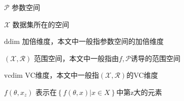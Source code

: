 
\begin{notation}

  \begin{notationlist}{2em}
    \item[$\displaystyle \mathcal{P}$] 参数空间
    \item[$\displaystyle \mathcal{X}$] 数据集所在的空间 
    \item[$\displaystyle \text{ddim}$] 加倍维度，本文中一般指参数空间的加倍维度
    \item[$\displaystyle (\mathcal{X},\mathcal{R})$] 范围空间，本文中一般指由$f,\mathcal{P}$诱导的范围空间
    \item[$\displaystyle \text{vcdim}$] VC维度，本文中一般指$(\mathcal{X},\mathcal{R})$的VC维度
    \item[$\displaystyle f(\theta,x_z)$] 表示在$\left\{f(\theta,x)|x\in X\right\}$中第z大的元素
  \end{notationlist}

\end{notation}





